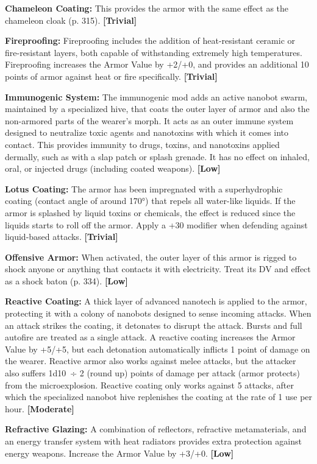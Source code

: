 \textbf{Chameleon Coating:} This provides the armor with 
the same effect as the chameleon cloak (p. 315). \textbf{[Trivial]}

\textbf{Fireproofing: }Fireproofing includes the addition of 
heat-resistant ceramic or fire-resistant layers, both 
capable of withstanding extremely high temperatures. 
Fireproofing increases the Armor Value by +2/+0, and 
provides an additional 10 points of armor against 
heat or fire specifically. \textbf{[Trivial]}

\textbf{Immunogenic System:} The immunogenic mod 
adds an active nanobot swarm, maintained by a specialized
hive, that coats the outer layer of armor and
also the non-armored parts of the wearer's morph. 
It acts as an outer immune system designed to neutralize
toxic agents and nanotoxins with which it
comes into contact. This provides immunity to drugs, 
toxins, and nanotoxins applied dermally, such as 
with a slap patch or splash grenade. It has no effect 
on inhaled, oral, or injected drugs (including coated 
weapons). \textbf{[Low]}

\textbf{Lotus Coating:} The armor has been impregnated 
with a superhydrophic coating (contact angle of 
around 170°) that repels all water-like liquids. If the 
armor is splashed by liquid toxins or chemicals, the 
effect is reduced since the liquids starts to roll off the 
armor. Apply a +30 modifier when defending against 
liquid-based attacks. \textbf{[Trivial]}

\textbf{Offensive Armor: }When activated, the outer layer of 
this armor is rigged to shock anyone or anything that 
contacts it with electricity. Treat its DV and effect as a 
shock baton (p. 334). \textbf{[Low]}

\textbf{Reactive Coating:} A thick layer of advanced 
nanotech is applied to the armor, protecting it with 
a colony of nanobots designed to sense incoming 
attacks. When an attack strikes the coating, it detonates
to disrupt the attack. Bursts and full autofire
are treated as a single attack. A reactive coating 
increases the Armor Value by +5/+5, but each detonation
automatically inflicts 1 point of damage on
the wearer. Reactive armor also works against melee 
attacks, but the attacker also suffers 1d10 ÷ 2 (round 
up) points of damage per attack (armor protects) 
from the microexplosion. Reactive coating only 
works against 5 attacks, after which the specialized 
nanobot hive replenishes the coating at the rate of 1 
use per hour. \textbf{[Moderate]}

\textbf{Refractive Glazing:} A combination of reflectors, 
refractive metamaterials, and an energy transfer 
system with heat radiators provides extra protection 
against energy weapons. Increase the Armor Value 
by +3/+0. \textbf{[Low]}

